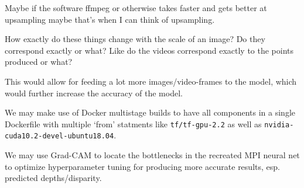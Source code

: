 Maybe if the software ffmpeg or otherwise takes faster and gets better at upsampling maybe that's when I can think of upsampling.

How exactly do these things change with the scale of an image? 
Do they correspond exactly or what? Like do the videos correspond exactly to the points produced or what?

This would allow for feeding a lot more images/video-frames to the model, which would further increase the accuracy of the model.

We may make use of Docker multistage builds to have all components in a single Dockerfile with multiple `from' statments like \texttt{tf/tf-gpu-2.2} as well as \texttt{nvidia-cuda10.2-devel-ubuntu18.04}.

We may use Grad-CAM to locate the bottlenecks in the recreated MPI neural net to optimize hyperparameter tuning for producing more accurate results, esp. predicted depths/disparity.